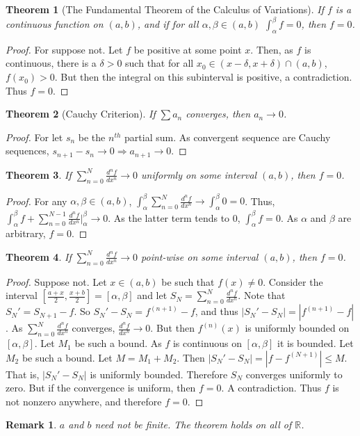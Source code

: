 \documentclass[crop=false,class=book]{standalone}
\theoremstyle{mystyle}
\newtheorem{theorem}{Theorem}[section]
\newtheorem{remark}{Remark}[section]
\begin{document}
\begin{theorem}[The Fundamental Theorem of the Calculus of Variations]
If $f$ is a continuous function on $(a,b)$, and if for all $\alpha,\beta\in (a,b)$ $\int_{\alpha}^{\beta}f = 0$, then $f=0$.
\end{theorem}
\begin{proof}
For suppose not. Let $f$ be positive at some point $x$. Then, as $f$ is continuous, there is a $\delta>0$ such that for all $x_0\in (x-\delta,x+\delta)\cap(a,b)$, $f(x_0)>0$. But then the integral on this subinterval is positive, a contradiction. Thus $f=0$.
\end{proof}
\begin{theorem}[Cauchy Criterion]
If $\sum a_n$ converges, then $a_n \rightarrow 0$.
\end{theorem}
\begin{proof}
For let $s_n$ be the $n^{th}$ partial sum. As convergent sequence are Cauchy sequences, $s_{n+1}-s_n \rightarrow 0\Rightarrow a_{n+1}\rightarrow 0$.
\end{proof}
\begin{theorem}
If $\sum_{n=0}^{N} \frac{d^{n}f}{dx^n} \rightarrow 0$ uniformly on some interval $(a,b)$, then $f=0$.
\end{theorem}
\begin{proof}
For any $\alpha, \beta\in (a,b)$, $\int_{\alpha}^{\beta} \sum_{n=0}^{N} \frac{d^{n}f}{dx^n} \rightarrow \int_{\alpha}^{\beta} 0 = 0$. Thus, $\int_{\alpha}^{\beta} f + \sum_{n=0}^{N-1} \frac{d^n f}{dx^n}\bigg|_{\alpha}^{\beta} \rightarrow 0$. As the latter term tends to $0$, $\int_{\alpha}^{\beta} f = 0$. As $\alpha$ and $\beta$ are arbitrary, $f=0$.
\end{proof}
\begin{theorem}
If $\sum_{n=0}^{N} \frac{d^n f}{dx^n} \rightarrow 0$ point-wise on some interval $(a,b)$, then $f=0$.
\end{theorem}
\begin{proof}
Suppose not. Let $x\in (a,b)$ be such that $f(x)\ne 0$. Consider the interval $[\frac{a+x}{2},\frac{x+b}{2}]=[\alpha,\beta]$ and let $S_N =\sum_{n=0}^{N} \frac{d^n f}{dx^n}$. Note that $S_N' = S_{N+1}-f$. So $S_N' - S_N = f^{(n+1)}-f$, and thus $|S_N'-S_N| = |f^{(n+1)}-f|$. As $\sum_{n=0}^{N} \frac{d^n f}{dx^n}$ converges, $\frac{d^n f}{dx^n} \rightarrow 0$. But then $f^{(n)}(x)$ is uniformly bounded on $[\alpha,\beta]$. Let $M_1$ be such a bound. As $f$ is continuous on $[\alpha,\beta]$ it is bounded. Let $M_2$ be such a bound. Let $M=M_1+M_2$. Then $|S_N'-S_N| = |f-f^{(N+1)}|\leq M$. That is, $|S_N'-S_N|$ is uniformly bounded. Therefore $S_N$ converges uniformly to zero. But if the convergence is uniform, then $f=0$. A contradiction. Thus $f$ is not nonzero anywhere, and therefore $f=0$.
\end{proof}
\begin{remark}
$a$ and $b$ need not be finite. The theorem holds on all of $\mathbb{R}$. 
\end{remark}
\end{document}
